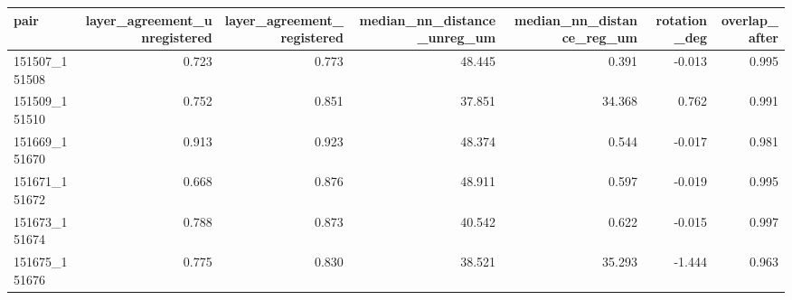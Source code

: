 \begin{tabular}{lrrrrrr}
\toprule
pair & layer_agreement_unregistered & layer_agreement_registered & median_nn_distance_unreg_um & median_nn_distance_reg_um & rotation_deg & overlap_after \\
\midrule
151507_151508 & 0.723 & 0.773 & 48.445 & 0.391 & -0.013 & 0.995 \\
151509_151510 & 0.752 & 0.851 & 37.851 & 34.368 & 0.762 & 0.991 \\
151669_151670 & 0.913 & 0.923 & 48.374 & 0.544 & -0.017 & 0.981 \\
151671_151672 & 0.668 & 0.876 & 48.911 & 0.597 & -0.019 & 0.995 \\
151673_151674 & 0.788 & 0.873 & 40.542 & 0.622 & -0.015 & 0.997 \\
151675_151676 & 0.775 & 0.830 & 38.521 & 35.293 & -1.444 & 0.963 \\
\bottomrule
\end{tabular}
